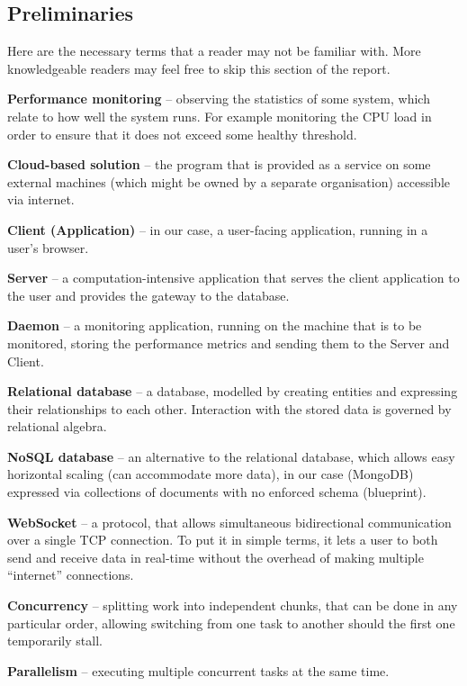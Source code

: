 \documentclass{l3proj}
\begin{document}
\begin{appendices}

\chapter{Preliminaries}
\label{prelim}

Here are the necessary terms that a reader may not be familiar with. More knowledgeable readers may feel free to skip this section of the report.

\textbf{Performance monitoring} -- observing the statistics of some system, which relate to how well the system runs. For example monitoring the CPU load in order to ensure that it does not exceed some healthy threshold.

\textbf{Cloud-based solution} -- the program that is provided as a service on some external machines (which might be owned by a separate organisation) accessible via internet.

\textbf{Client (Application)} -- in our case, a user-facing application, running in a user’s browser.

\textbf{Server} -- a computation-intensive application that serves the client application to the user and provides the gateway to the database.

\textbf{Daemon} -- a monitoring application, running on the machine that is to be monitored, storing the performance metrics and sending them to the Server and Client.

\textbf{Relational database} -- a database, modelled by creating entities and expressing their relationships to each other. Interaction with the stored data is governed by relational algebra.

\textbf{NoSQL database} -- an alternative to the relational database, which allows easy horizontal scaling (can accommodate more data), in our case (MongoDB) expressed via collections of documents with no enforced schema (blueprint).

\textbf{WebSocket} -- a protocol, that allows simultaneous bidirectional communication over a single TCP connection. To put it in simple terms, it lets a user to both send and receive data in real-time without the overhead of making multiple ``internet'' connections.

\textbf{Concurrency} -- splitting work into independent chunks, that can be done in any particular order, allowing switching from one task to another should the first one temporarily stall.

\textbf{Parallelism} -- executing multiple concurrent tasks at the same time. 


\end{appendices}
\end{document}
